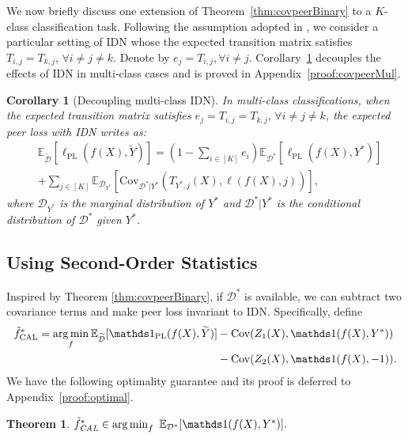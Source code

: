 \documentclass[final]{cvpr}
\DeclareMathOperator*{\argmin}{arg\,min}
\newcommand{\BR}{\mathds 1}
\newcommand{\E}{\mathbb E}
\newtheorem{theorem}{Theorem}
\newtheorem{corollary}{Corollary}
\newcommand{\rev}[1]{{\color{blue}#1}}
\newcommand{\rev}[1]{#1}
\newcommand{\covpeer}{\text{CAL}}
\begin{document}
\rev{We now briefly discuss one extension of Theorem~\ref{thm:covpeerBinary} to a $K$-class classification task.
Following the assumption adopted in \cite{liu2019peer}, we consider a particular setting of IDN whose the expected transition matrix satisfies $T_{i,j}=T_{k,j},\, \forall i\ne j\ne k$.}
Denote by $e_j=T_{i,j}, \forall i\ne j$.
\rev{Corollary~\ref{cor:covpeerMul} decouples the effects of IDN in multi-class cases and is proved in Appendix~\ref{proof:covpeerMul}.}
\begin{corollary}[Decoupling multi-class IDN]
\label{cor:covpeerMul}
In multi-class classifications, when the expected transition matrix satisfies $e_j = T_{i,j}=T_{k,j},\, \forall i\ne j\ne k$,  the expected peer loss with IDN writes as:
\begin{align*}
&\E_{\widetilde{\mathcal D}}[\ell_{\text{PL}}(f(X),\widetilde{Y})] =(1-\sum_{i\in[K]}e_i)\E_{\mathcal D^*}[\ell_{\text{PL}}(f(X),Y^*)]\\
& + \sum_{j\in[K]}  \mathbb E_{\mathcal D_{Y^*}} \left[\text{Cov}_{\mathcal D^*|Y^*} \left(T_{Y^*,j}(X), \ell(f(X), j)\right)\right],
\end{align*}
where $\mathcal D_{Y^*}$ is the marginal distribution of $Y^*$ and $\mathcal D^*|Y^*$ is the conditional distribution of $\mathcal D^*$ given $Y^*$.  \end{corollary}




\subsection{Using Second-Order Statistics}

Inspired by Theorem \ref{thm:covpeerBinary}, if $\mathcal D^*$ is available, we can subtract two covariance terms and make peer loss invariant to IDN.
Specifically, define 
{\small
\begin{align*}
 \tilde f^*_{\text{\covpeer{}}} = \argmin_{f}  \E_{\widetilde{\mathcal D}}[{\BR_{\text{PL}}}(f(X),\widetilde{Y})] 
 &- \text{Cov}(Z_1(X),\BR(f(X),Y^*)) \\
 & - \text{Cov}(Z_2(X),\BR(f(X),-1)) .
\end{align*}}
We have the following optimality guarantee and its proof is deferred to Appendix~\ref{proof:optimal}. \begin{theorem}
\label{thm:optimal}
$\tilde f^*_{\emph{\text{\covpeer{}}}} \in \argmin_{f} ~\E_{\mathcal D^*}[\BR(f(X),Y^*)].$
\end{theorem}
\end{document}
